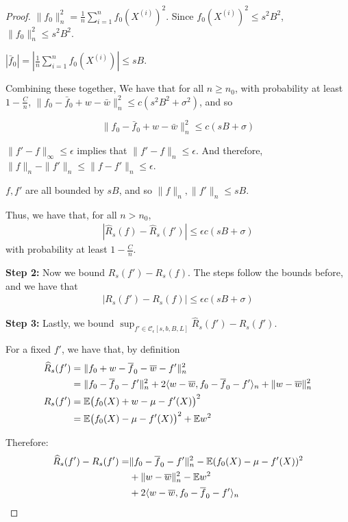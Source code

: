 \begin{proof}
$\|f_0\|^2_n = \frac{1}{n} \sum_{i=1}^n f_0(X^{(i)})^2$. Since $f_0(X^{(i)})^2 \leq s^2 B^2$, $\|f_0\|^2_n \leq s^2 B^2$.

$|\bar{f}_0| = | \frac{1}{n} \sum_{i=1}^n f_0(X^{(i)})| \leq s B$.

Combining these together, We have that for all $n \geq n_0$, with probability at least $1-\frac{C}{n}$, $\| f_0 - \bar{f}_0 + w -\bar{w} \|^2_n \leq c ( s^2 B^2 +\sigma^2 )$, and so 

\[
\|f_0 - \bar{f}_0 + w -\bar{w} \|^2_n \leq c (sB + \sigma)
\]

$\| f' - f \|_\infty \leq \epsilon$ implies that $\| f' - f\|_n \leq \epsilon$. And therefore, $\| f \|_n - \|f'\|_n \leq \| f - f' \|_n \leq \epsilon$. 

$f,f'$ are all bounded by $sB$, and so $\|f \|_n, \| f' \|_n \leq sB$.

Thus, we have that, for all $n > n_0$,
\begin{align}
|\hat{R}_s(f) - \hat{R}_s(f')| \leq \epsilon c( sB + \sigma ) \label{eqn:approx_deviation1}
\end{align}
with probability at least $1-\frac{C}{n}$.

\textbf{Step 2:} Now we bound $R_s(f') - R_s(f)$. The steps follow the bounds before, and we have that 
\begin{align}
|R_s(f') - R_s(f)| \leq \epsilon c(sB + \sigma) \label{eqn:approx_deviation2}
\end{align}

\textbf{Step 3:} Lastly, we bound $\sup_{f' \in \mathcal{C}_\epsilon[s,b,B,L]} \hat{R}_s(f') - R_s(f')$. 

For a fixed $f'$, we have that, by definition
\begin{align*}
\widehat{R}_s (f') &= \| f_0 + w - \overline{f}_0 - \overline{w} - f' \|_n^2\\
      &= \|f_0 - \overline{f}_0 - f'\|_n^2 + 2 \langle w - \overline{w}, f_0 - \overline{f}_0 - f'\rangle_n
             + \| w - \overline{w}\|_n^2\\
R_s(f') &= {\mathbb E}\big(f_0(X) + w - \mu - f'(X)\big)^2 \\
     &= {\mathbb E}\big(f_0(X) - \mu - f'(X)\big)^2 + {\mathbb E} w^2 
\end{align*}

Therefore:
\begin{align*}
\widehat{R}_s(f') - R_s(f') = & \|f_0 -\overline{f}_0 - f'\|_n^2 - {\mathbb E}(f_0(X) - \mu - f'(X))^2 \\
            &+ \|w - \overline{w}\|_n^2 - {\mathbb E} w^2 \\
            &+ 2\langle w-\overline{w}, f_0 - \overline{f}_0 - f'\rangle_n
\end{align*}


\end{proof}
